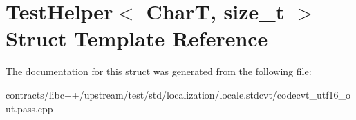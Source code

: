 \hypertarget{struct_test_helper}{}\section{Test\+Helper$<$ CharT, size\+\_\+t $>$ Struct Template Reference}
\label{struct_test_helper}


The documentation for this struct was generated from the following file\+:\begin{DoxyCompactItemize}
\item 
contracts/libc++/upstream/test/std/localization/locale.\+stdcvt/codecvt\+\_\+utf16\+\_\+out.\+pass.\+cpp\end{DoxyCompactItemize}

